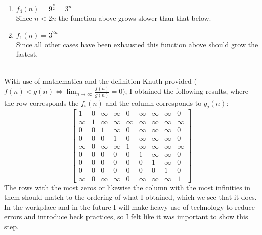 \documentclass[12pt]{article}
\begin{document}
\begin{enumerate}
\item \begin{math}f_4(n) = 9^{\frac{n}{2}} = 3^{n}\end{math}\\
Since \begin{math}n < 2n\end{math} the function above grows slower than that below.
\item \begin{math}f_1(n) = 3^{2n}\end{math}\\
Since all other cases have been exhausted this function above should grow the fastest.\\\\
\end{enumerate}
With use of mathematica and the definition Knuth provided (\begin{math}f(n) < g(n) \Longleftrightarrow \lim_{n\to\infty} \frac{f(n)}{g(n)} = 0\end{math}), I obtained the following results, where the row corresponds the \begin{math}f_i(n)\end{math} and  the column corresponds to \begin{math}g_j(n)\end{math}:\\
\[
    \begin{bmatrix}
        1 & 0 & \infty & \infty & 0 & \infty & \infty & \infty & 0\\
        \infty & 1 & \infty & \infty & \infty & \infty & \infty & \infty & \infty\\
        0 & 0 & 1 & \infty & 0 & \infty & \infty & \infty & 0\\
        0 & 0 & 0 & 1 & 0 & \infty & \infty & \infty & 0\\
        \infty & 0 & \infty & \infty & 1 & \infty & \infty & \infty & \infty\\
        0 & 0 & 0 & 0 & 0 & 1 & \infty & \infty & 0\\
        0 & 0 & 0 & 0 & 0 & 0 & 1 & \infty & 0\\
        0 & 0 & 0 & 0 & 0 & 0 & 0 & 1 & 0\\
        \infty & 0 & \infty & \infty & 0 & \infty & \infty & \infty & 1
    \end{bmatrix}
\]
The rows with the most zeros or likewise the column with the most infinities in them should match to the ordering of what I obtained, which we see that it does. In the workplace and in the future I will make heavy use of technology to reduce errors and introduce beck practices, so I felt like it was important to show this step.
\end{document}
